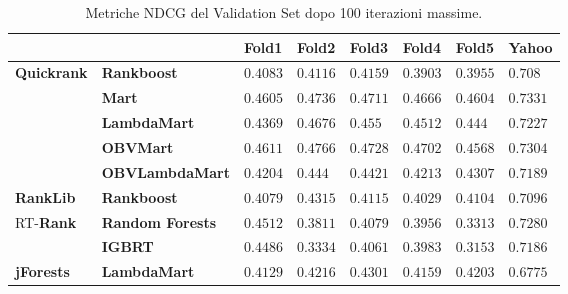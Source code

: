 		\begin{table}[!h]
			\centering
			\begin{tabular}{ll|l|l|l|l|l|l|}
				&& \textbf{Fold1} & \textbf{Fold2} & \textbf{Fold3} & \textbf{Fold4} & \textbf{Fold5} & \textbf{Yahoo}\\
				\hline
				\multirow{5}{*}{\textbf{Quickrank}} & \textbf{Rankboost} & $0.4083$ & $0.4116$ & $0.4159$ & $0.3903$ & $0.3955$ & $0.708$\\
				\cline{2-8}
				& \textbf{Mart} & $0.4605$ & $0.4736$ & $0.4711$ & $0.4666$ & $0.4604$ & $0.7331$\\
				\cline{2-8}
				& \textbf{LambdaMart} & $0.4369$ & $0.4676$ & $0.455$ & $0.4512$ & $0.444$ & $0.7227$\\
				\cline{2-8}
				& \textbf{OBVMart} & $0.4611$ & $0.4766$ & $0.4728$ & $0.4702$ & $0.4568$ & $0.7304$\\
				\cline{2-8}
				& \textbf{OBVLambdaMart} & $0.4204$ & $0.444$ & $0.4421$ & $0.4213$ & $0.4307$ & $0.7189$\\
				\hline
				\textbf{RankLib} & \textbf{Rankboost} & $0.4079$ & $0.4315$ & $0.4115$ & $0.4029$ & $0.4104$ & $0.7096$\\
				\hline
				\multirow{2}{*}{RT-\textbf{Rank}} & \textbf{Random Forests} & $0.4512$ & $0.3811$ & $0.4079$ & $0.3956$ & $0.3313$ & $0.7280$\\
				\cline{2-8}
				& \textbf{IGBRT} & $0.4486$ & $0.3334$ & $0.4061$ & $0.3983$ & $0.3153$ & $0.7186$\\
				\hline
				\textbf{jForests} & \textbf{LambdaMart} & $0.4129$ & $0.4216$ & $0.4301$ & $0.4159$ & $0.4203$ & $0.6775$\\
				\hline
			\end{tabular}
			\caption{Metriche NDCG del Validation Set dopo 100 iterazioni massime.}
			\label{fig:vali_100}
		\end{table}
		
